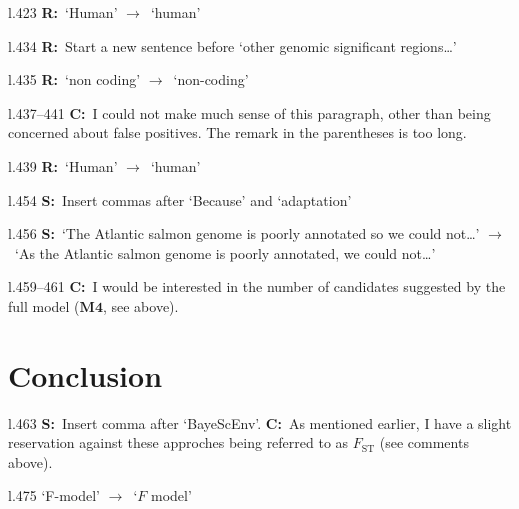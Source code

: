 \documentclass[11pt]{article}
\newenvironment{my_description}
{\begin{description}
  \setlength{\itemsep}{2pt}
  \setlength{\parskip}{0pt}
  \setlength{\parsep}{0pt}}
{\end{description}}
\newcommand{\ra}{$\rightarrow$\ }
\newcommand{\C}{\textbf{C:}\ }
\newcommand{\R}{\textbf{R:}\ }
\newcommand{\V}{\textbf{S:}\ }
\begin{document}
\begin{my_description}
	\item[l.423] \R `Human' \ra `human'
	\item[l.434] \R Start a new sentence before `other genomic significant regions\dots'
	\item[l.435] \R `non coding' \ra `non-coding'
	\item[l.437--441] \C I could not make much sense of this paragraph, other than being concerned about false positives. The remark in the parentheses is too long.
	\item[l.439] \R `Human' \ra `human'
	\item[l.454] \V Insert commas after `Because' and `adaptation'
	\item[l.456] \V `The Atlantic salmon genome is poorly annotated so we could not\dots' \ra `As the Atlantic salmon genome is poorly annotated, we could not\dots'
	\item[l.459--461] \C I would be interested in the number of candidates suggested by the full model ($\mathbf{M4}$, see above).
	
\end{my_description}

\section{Conclusion}
\begin{my_description}
	\item[l.463] \V Insert comma after `BayeScEnv'. \C As mentioned earlier, I have a slight reservation against these approches being referred to as $F_{\mathrm{ST}}$ (see comments above).
	\item[l.475] `F-model' \ra `$F$ model'
\end{my_description}
	
\end{document}
